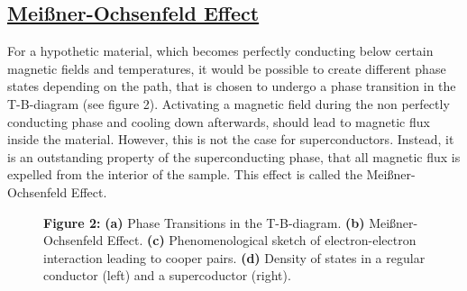 \documentclass[a4paper]{scrartcl}
\numberwithin{equation}{section}
\numberwithin{figure}{section}
\numberwithin{table}{section}
\newcommand{\ssubsection}[1]{{ \subsection*{\linebreak \centering\bf\underline {#1}}}}
\begin{document}
\ssubsection{Mei\ss ner-Ochsenfeld Effect}
For a hypothetic material, which becomes perfectly conducting below certain magnetic fields and temperatures, it would be possible to create different phase states depending on the path, that is chosen to undergo a phase transition in the T-B-diagram (see figure 2). Activating a magnetic field during the non perfectly conducting phase and cooling down afterwards, should lead to magnetic flux inside the material. However, this is not the case for superconductors. Instead, it is an outstanding property of the superconducting phase, that all magnetic flux is expelled from the interior of the sample. This effect is called the Meißner-Ochsenfeld Effect.

\begin{figure}[!tbh]
\caption*{\textbf{Figure 2: }\small \textbf{(a)} Phase Transitions in the T-B-diagram. \textbf{(b)} Meißner-Ochsenfeld Effect. \textbf{(c)} Phenomenological sketch of electron-electron interaction leading to cooper pairs. \textbf{(d)} Density of states in a regular conductor (left) and a supercoductor (right).}
\label{fig:tb}
\end{figure}
\end{document}
